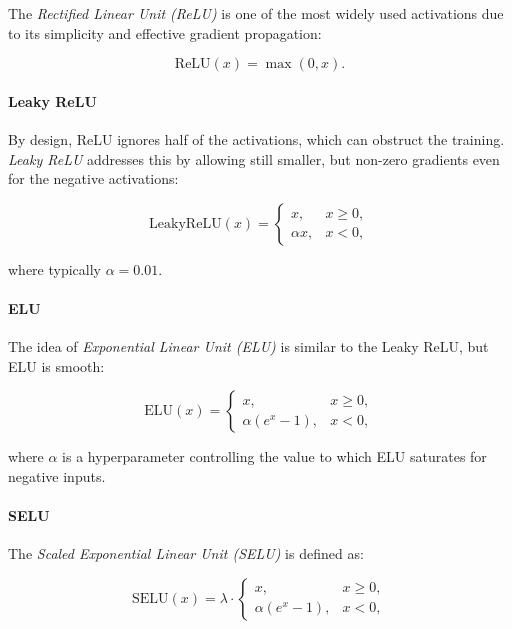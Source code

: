 The \emph{Rectified Linear Unit (ReLU)} is one of the most widely used activations due to its simplicity and effective gradient propagation:

\begin{equation}
    \mathrm{ReLU}(x) = \max(0, x).
\end{equation}

\paragraph{Leaky ReLU}

By design, ReLU ignores half of the activations, which can obstruct the training. \emph{Leaky ReLU} addresses this by allowing still smaller, but non-zero gradients even for the negative activations:

\begin{equation}
    \mathrm{LeakyReLU}(x) = 
    \begin{cases}
        x, & x \ge 0, \\
        \alpha x, & x < 0,
    \end{cases}
\end{equation}

where typically $\alpha = 0.01$.

\paragraph{ELU}

The idea of \emph{Exponential Linear Unit (ELU)} is similar to the Leaky ReLU, but ELU is smooth:

\begin{equation}
    \mathrm{ELU}(x) = 
    \begin{cases}
        x, & x \ge 0, \\
        \alpha (e^x - 1), & x < 0,
    \end{cases}
\end{equation}

where $\alpha$ is a hyperparameter controlling the value to which ELU saturates for negative inputs.

\paragraph{SELU}

The \emph{Scaled Exponential Linear Unit (SELU)} is defined as:

\begin{equation}
    \mathrm{SELU}(x) = \lambda \cdot
    \begin{cases}
        x, & x \ge 0, \\
        \alpha (e^x - 1), & x < 0,
    \end{cases}
\end{equation}

